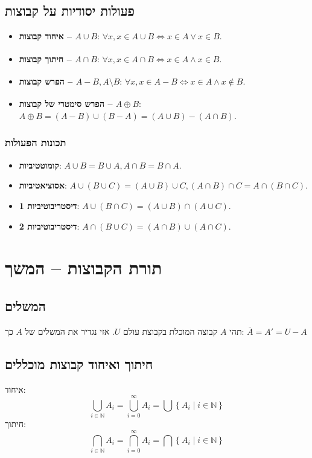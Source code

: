 \documentclass[11pt, oneside]{article}
\newcommand{\bidiarrow}[1]{\underset{\text{#1}}{\Leftrightarrow}}
\newcommand{\mN}{\mathbb{N}}
\newcommand{\definition}[2]{\textbf{#1}: #2.}
\begin{document}
\subsection*{פעולות יסודיות על קבוצות}
\begin{itemize}
\item \definition{איחוד קבוצות -- $A \cup B$}{$\forall x, x \in A \cup B \bidiarrow{} x \in A \lor x \in B$}
\item \definition{חיתוך קבוצות -- $A \cap B$}{$\forall x, x \in A \cap B \bidiarrow{} x \in A \land x \in B$}
\item \definition{הפרש קבוצות -- $A - B, A \setminus B$}{$\forall x, x \in A - B \bidiarrow{} x \in A \land x \not\in B$}
\item \definition{הפרש סימטרי של קבוצות -- $A \oplus B$}{$A \oplus B = (A - B) \cup (B - A) = (A \cup B) - (A \cap B )$}
\end{itemize}


\subsubsection*{תכונות הפעולות}
\begin{itemize}
\item \definition{קומוטטיביות}{$A \cup B = B \cup A, A \cap B = B \cap A$}
\item \definition{אסוציאטיביות}{$A \cup (B \cup C) = (A \cup B) \cup C, (A \cap B) \cap C = A \cap (B \cap C)$}
\item \definition{דיסטריבוטיביות 1}{$A \cup (B \cap C) = (A \cup B) \cap (A \cup C)$}
\item \definition{דיסטריבוטיביות 2}{$A \cap (B \cup C) = (A \cap B) \cup (A \cap C)$}
\end{itemize}
\clearpage

\section*{תורת הקבוצות -- המשך}
\subsection*{המשלים}
תהי $A$ קבוצה המוכלת בקבוצת עולם $U$. אזי נגדיר את המשלים של $A$ כך: $\overline{A} = A' = U - A$

\subsection*{חיתוך ואיחוד קבוצות מוכללים}
איחוד:
\[
\bigcup_{i \in \mN} A_{i} = \bigcup^{\infty}_{i = 0} A_{i} = \bigcup \left\{{A_{i} \mid i \in \mN}\right\}
\]
חיתוך:
\[
\bigcap_{i \in \mN} A_{i} = \bigcap^{\infty}_{i = 0} A_{i} = \bigcap \left\{{A_{i} \mid i \in \mN}\right\}
\]
\end{document}
